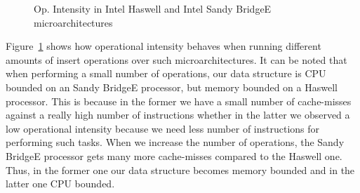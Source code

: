 \begin{figure}\centering
	\caption{Op. Intensity in Intel Haswell and Intel Sandy BridgeE microarchitectures}
	\label{fig:haswell_ivybridge}
\end{figure}

Figure~\ref{fig:haswell_ivybridge} shows how operational intensity behaves when running different amounts of insert operations over such microarchitectures. It can be noted that when performing a small number of operations, our data structure is CPU bounded on an Sandy BridgeE processor, but memory bounded on a Haswell processor. This is because in the former we have a small number of cache-misses against a really high number of instructions whether in the latter we observed a low operational intensity because we need less number of instructions for performing such tasks. When we increase the number of operations, the Sandy BridgeE processor gets many more cache-misses compared to the Haswell one. Thus, in the former one our data structure becomes memory bounded and in the latter one CPU bounded.
